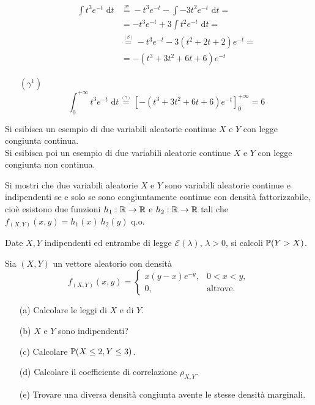 \begin{enumerate}
\begin{gather*}
\begin{aligned}
\int t^3e^{-t}\text{ d}t&\overset{\underset{\textit{pp}}{}}{=}-t^3e^{-t}-\int-3t^2e^{-t}\text{ d}t=\\
&=-t^3e^{-t}+3\int t^2e^{-t}\text{ d}t=\\
&\overset{\underset{(\beta)}{}}{=}-t^3e^{-t}-3(t^2+2t+2)e^{-t}=\\
&=-(t^3+3t^2+6t+6)e^{-t}
\end{aligned}
\end{gather*}
\item [$(\gamma^1)$]
\begin{equation*}
\int_0^{+\infty} t^3e^{-t}\text{ d}t\overset{\underset{(\gamma)}{}}{=}\left[-(t^3+3t^2+6t+6)e^{-t}\right]_0^{+\infty}=6
\end{equation*}

\end{enumerate}


\newpage

\ParteEsercizi

\Esercizio{} %
Si esibisca un esempio di due variabili aleatorie continue $X$ e $Y$ con legge congiunta continua. \\
Si esibisca poi un esempio di due variabili aleatorie continue $X$ e $Y$ con legge congiunta non continua.

\Esercizio{$^\ast$}
Si mostri che due variabili aleatorie $X$ e $Y$ sono variabili aleatorie continue e indipendenti se e solo se sono congiuntamente continue con densità fattorizzabile, cioè esistono due funzioni $h_1:\mathbb{R}\to\mathbb{R}$ e $h_2:\mathbb{R}\to\mathbb{R}$ tali che $f_{(X,Y)}(x,y)=h_1(x)\ h_2(y)$ q.o.

\Esercizio{}
Date $X,Y$ indipendenti ed entrambe di legge $\mathcal{E}(\lambda)$, $\lambda>0$, si calcoli $\mathbb{P}(Y>X)$.

\Esercizio{}
Sia $(X,Y)$ un vettore aleatorio con densità
\begin{equation*}
f_{(X,Y)}(x,y)=\begin{cases} x(y-x)e^{-y},&0<x<y, \\ 0,&\text{altrove}.\end{cases}
\end{equation*}
\begin{enumerate}
\item [(a)] Calcolare le leggi di $X$ e di $Y$.
\item [(b)] $X$ e $Y$ sono indipendenti?
\item [(c)] Calcolare $\mathbb{P}(X\leq 2,Y\leq 3)$.
\item [(d)] Calcolare il coefficiente di correlazione $\rho_{X,Y}$.
\item [(e)] Trovare una diversa densità congiunta avente le stesse densità marginali.
\end{enumerate}

